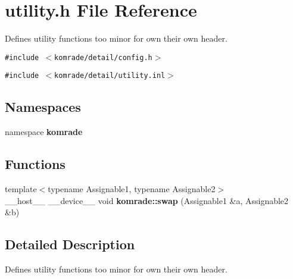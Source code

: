 \section{utility.h File Reference}
\label{utility_8h}
Defines utility functions too minor for own their own header. 

{\tt \#include $<$komrade/detail/config.h$>$}\par
{\tt \#include $<$komrade/detail/utility.inl$>$}\par
\subsection*{Namespaces}
\begin{CompactItemize}
\item 
namespace {\bf komrade}
\end{CompactItemize}
\subsection*{Functions}
\begin{CompactItemize}
\item 
{\footnotesize template$<$typename Assignable1, typename Assignable2$>$ }\\\_\-\_\-host\_\-\_\- \_\-\_\-device\_\-\_\- void {\bf komrade::swap} (Assignable1 \&a, Assignable2 \&b)
\end{CompactItemize}


\subsection{Detailed Description}
Defines utility functions too minor for own their own header. 


